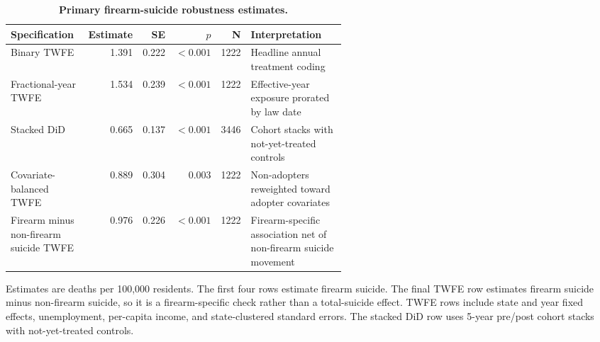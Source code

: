 \begin{table}[H]
\centering
\caption{\textbf{Primary firearm-suicide robustness estimates.}}
\label{tab:main_robustness}
\begin{threeparttable}
\small
\begin{tabular}{@{}p{0.24\linewidth}rrrrp{0.31\linewidth}@{}}
\toprule
Specification & Estimate & SE & $p$ & N & Interpretation \\
\midrule
Binary TWFE & 1.391 & 0.222 & $<0.001$ & 1222 & Headline annual treatment coding \\
Fractional-year TWFE & 1.534 & 0.239 & $<0.001$ & 1222 & Effective-year exposure prorated by law date \\
Stacked DiD & 0.665 & 0.137 & $<0.001$ & 3446 & Cohort stacks with not-yet-treated controls \\
Covariate-balanced TWFE & 0.889 & 0.304 & 0.003 & 1222 & Non-adopters reweighted toward adopter covariates \\
Firearm minus non-firearm suicide TWFE & 0.976 & 0.226 & $<0.001$ & 1222 & Firearm-specific association net of non-firearm suicide movement \\
\bottomrule
\end{tabular}
\begin{tablenotes}
\small
\item Estimates are deaths per 100,000 residents. The first four rows estimate firearm suicide. The final TWFE row estimates firearm suicide minus non-firearm suicide, so it is a firearm-specific check rather than a total-suicide effect. TWFE rows include state and year fixed effects, unemployment, per-capita income, and state-clustered standard errors. The stacked DiD row uses 5-year pre/post cohort stacks with not-yet-treated controls.
\end{tablenotes}
\end{threeparttable}
\end{table}
